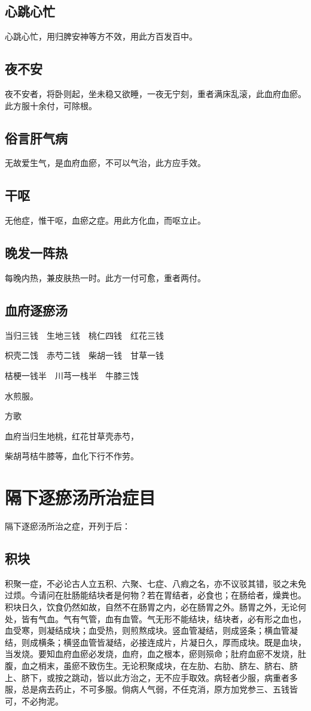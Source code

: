 \documentclass[a4paper,12pt,UTF8,twoside]{ctexbook}
\begin{document}
	\section{心跳心忙}
	心跳心忙，用归脾安神等方不效，用此方百发百中。
	\section{夜不安}
	夜不安者，将卧则起，坐未稳又欲睡，一夜无宁刻，重者满床乱滚，此血府血瘀。此方服十余付，可除根。
	\section{俗言肝气病}
	无故爱生气，是血府血瘀，不可以气治，此方应手效。
	\section{干呕}
	无他症，惟干呕，血瘀之症。用此方化血，而呕立止。
	\section{晚发一阵热}
	每晚内热，兼皮肤热一时。此方一付可愈，重者两付。
	\section{血府逐瘀汤}
	
	
	当归三钱　生地三钱　桃仁四钱　红花三钱
	
	枳壳二饯　赤芍二钱　柴胡一钱　甘草一钱
	
	桔梗一钱半　川芎一栈半　牛膝三饯
	
	水煎服。
	
	方歌
	
	血府当归生地桃，红花甘草壳赤芍，
	
	柴胡芎桔牛膝等，血化下行不作劳。
	
	\chapter{隔下逐瘀汤所治症目}
	隔下逐瘀汤所治之症，开列于后：
	\section{积块}
	积聚一症，不必论古人立五积、六聚、七症、八瘕之名，亦不议驳其错，驳之未免过烦。今请问在肚肠能结块者是何物？若在胃结者，必食也；在肠给者，燥粪也。积块日久，饮食仍然如故，自然不在肠胃之内，必在肠胃之外。肠胃之外，无论何处，皆有气血。气有气管，血有血管。气无形不能结块，结块者，必有形之血也，血受寒，则凝结成块；血受热，则煎熬成块。竖血管凝结，则成竖条；横血管凝结，则成横条；横竖血管皆凝结，必接连成片，片凝日久，厚而成块。既是血块，当发烧。要知血府血瘀必发烧，血府，血之根本，瘀则殒命；肚府血瘀不发烧，肚腹，血之梢末，虽瘀不致伤生。无论积聚成块，在左肋、右肋、脐左、脐右、脐上、脐下，或按之跳动，皆以此方治之，无不应手取效。病轻者少服，病重者多服，总是病去药止，不可多服。倘病人气弱，不任克消，原方加党参三、五钱皆可，不必拘泥。
\end{document}
